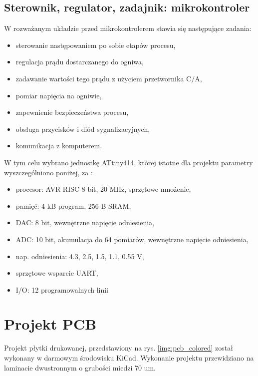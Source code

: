 \documentclass[polish,engineer]{polsl-msth}
\begin{document}
\subsection{Sterownik, regulator, zadajnik: mikrokontroler}
W rozważanym układzie przed mikrokontrolerem stawia się następujące zadania:
\begin{itemize}
    \item sterowanie następowaniem po sobie etapów procesu,
    \item regulacja prądu dostarczanego do ogniwa,
    \item zadawanie wartości tego prądu z użyciem przetwornika C/A,
    \item pomiar napięcia na ogniwie,
    \item zapewnienie bezpieczeństwa procesu,
    \item obsługa przycisków i diód sygnalizacyjnych,
    \item komunikacja z komputerem.
\end{itemize}
W tym celu wybrano jednostkę ATtiny414, której istotne dla projektu parametry wyszczególniono poniżej, za \cite{tiny414datasheet}:
\begin{itemize}
    \item procesor: AVR RISC 8 bit, 20 MHz, sprzętowe mnożenie,
    \item pamięć: 4 kB program, 256 B SRAM,
    \item DAC: 8 bit, wewnętrzne napięcie odniesienia,
    \item ADC: 10 bit, akumulacja do 64 pomiarów, wewnętrzne napięcie odniesienia, 
    \item nap. odniesienia: 4.3, 2.5, 1.5, 1.1, 0.55 V,
    \item sprzętowe wsparcie UART,
    \item I/O: 12 programowalnych linii
\end{itemize}

\section{Projekt PCB}
Projekt płytki drukowanej, przedstawiony na rys. \ref{img:pcb_colored} został wykonany w darmowym środowisku KiCad. Wykonanie projektu przewidziano na laminacie dwustronnym o grubości miedzi 70 um.
\end{document}
